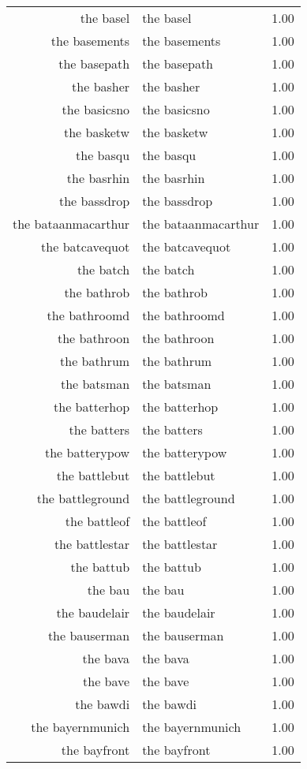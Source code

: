 \begin{table}[ht]
\begin{tabular}{rlr}
  the basel & the basel & 1.00 \\ 
  the basements & the basements & 1.00 \\ 
  the basepath & the basepath & 1.00 \\ 
  the basher & the basher & 1.00 \\ 
  the basicsno & the basicsno & 1.00 \\ 
  the basketw & the basketw & 1.00 \\ 
  the basqu & the basqu & 1.00 \\ 
  the basrhin & the basrhin & 1.00 \\ 
  the bassdrop & the bassdrop & 1.00 \\ 
  the bataanmacarthur & the bataanmacarthur & 1.00 \\ 
  the batcavequot & the batcavequot & 1.00 \\ 
  the batch & the batch & 1.00 \\ 
  the bathrob & the bathrob & 1.00 \\ 
  the bathroomd & the bathroomd & 1.00 \\ 
  the bathroon & the bathroon & 1.00 \\ 
  the bathrum & the bathrum & 1.00 \\ 
  the batsman & the batsman & 1.00 \\ 
  the batterhop & the batterhop & 1.00 \\ 
  the batters & the batters & 1.00 \\ 
  the batterypow & the batterypow & 1.00 \\ 
  the battlebut & the battlebut & 1.00 \\ 
  the battleground & the battleground & 1.00 \\ 
  the battleof & the battleof & 1.00 \\ 
  the battlestar & the battlestar & 1.00 \\ 
  the battub & the battub & 1.00 \\ 
  the bau & the bau & 1.00 \\ 
  the baudelair & the baudelair & 1.00 \\ 
  the bauserman & the bauserman & 1.00 \\ 
  the bava & the bava & 1.00 \\ 
  the bave & the bave & 1.00 \\ 
  the bawdi & the bawdi & 1.00 \\ 
  the bayernmunich & the bayernmunich & 1.00 \\ 
  the bayfront & the bayfront & 1.00 \\ 

\end{tabular}
\end{table}
